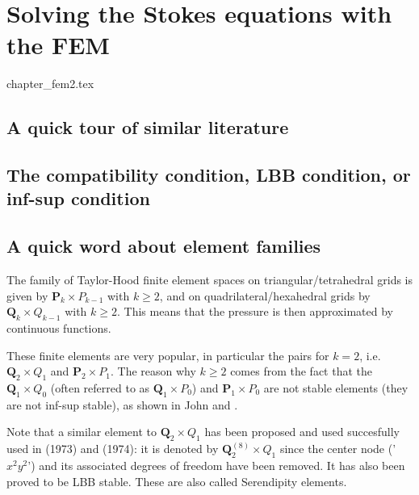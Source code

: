 \chapter{Solving the Stokes equations with the FEM} \label{solvingFEM} %
\begin{flushright} {\tiny {\color{gray} chapter\_fem2.tex}} \end{flushright}

\section{A quick tour of similar literature} 
 

\section{The compatibility condition, LBB condition, or inf-sup condition} \label{ss:LBBcond}
 


\section{A quick word about element families}

The family of {\color{olive} Taylor-Hood} finite element spaces on triangular/tetrahedral 
grids is given by ${\bm P}_k \times P_{k-1}$ with $k\geq 2$, 
and on quadrilateral/hexahedral grids by ${\bm Q}_k \times Q_{k-1}$ with $k\geq 2$.
This means that the pressure is then approximated by continuous functions. 

These finite elements are very popular, in particular the pairs for $k=2$, i.e.
${\bm Q}_2\times Q_1$ and ${\bm P}_2\times P_1$.
The reason why $k\geq 2$ comes from the fact that the 
${\bm Q}_1 \times Q_0$ (often referred to as ${\bm Q}_1 \times P_0$) and ${\bm P}_1\times P_0$
are not stable elements (they are not inf-sup stable), as
shown in John \cite[p64]{john16} and \cite[p67]{john16}. 

\begin{remark}
Note that a similar element to ${\bm Q}_2 \times Q_1$ has been proposed
and used succesfully used in \textcite{taho73} (1973) and \textcite{hota74} (1974): 
it is denoted by ${\bm Q}_2^{(8)} \times Q_1$ 
since the center node ('$x^2y^2$') and its associated degrees of freedom have been removed. It 
has also been proved to be LBB stable. These are also called {\color{olive} Serendipity} elements. 
\end{remark}

